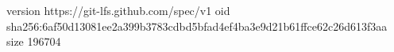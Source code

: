 version https://git-lfs.github.com/spec/v1
oid sha256:6af50d13081ee2a399b3783cdbd5bfad4ef4ba3e9d21b61ffce62c26d613f3aa
size 196704
